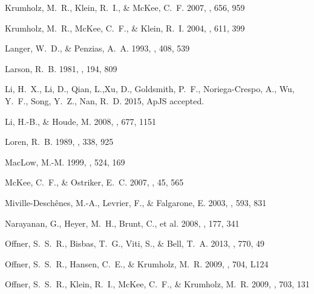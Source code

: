 \documentclass[iop,revtex4]{emulateapj}
\begin{document}
\begin{thebibliography}{40}
{Krumholz}, M.~R., {Klein}, R.~I., \& {McKee}, C.~F. 2007, \apj, 656, 959

{Krumholz}, M.~R., {McKee}, C.~F., \& {Klein}, R.~I. 2004, \apj, 611, 399

{Langer}, W.~D., \& {Penzias}, A.~A. 1993, \apj, 408, 539

{Larson}, R.~B. 1981, \mnras, 194, 809

{Li}, H.~X., {Li}, D., {Qian}, L.,{Xu}, D., {Goldsmith}, P.~F., {Noriega-Crespo}, A., {Wu}, Y.~F., {Song}, Y.~Z., {Nan}, R.~D. 2015, ApJS accepted.

{Li}, H.-B., \& {Houde}, M. 2008, \apj, 677, 1151

{Loren}, R.~B. 1989, \apj, 338, 925

{MacLow}, M.-M. 1999, \apj, 524, 169

{McKee}, C.~F., \& {Ostriker}, E.~C. 2007, \araa, 45, 565

{Miville-Desch{\^e}nes}, M.-A., {Levrier}, F., \& {Falgarone}, E. 2003, \apj,
  593, 831

{Narayanan}, G., {Heyer}, M.~H., {Brunt}, C., et al. 2008, \apjs, 177, 341

{Offner}, S.~S.~R., {Bisbas}, T.~G., {Viti}, S., \& {Bell}, T.~A. 2013, \apj,
  770, 49

{Offner}, S.~S.~R., {Hansen}, C.~E., \& {Krumholz}, M.~R. 2009{},
  \apjl, 704, L124

{Offner}, S.~S.~R., {Klein}, R.~I., {McKee}, C.~F., \& {Krumholz}, M.~R.
  2009{}, \apj, 703, 131


\end{thebibliography}
\end{document}

